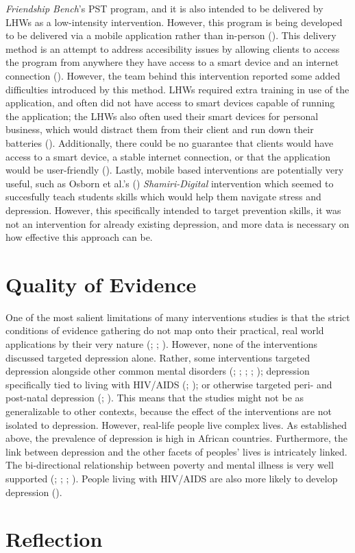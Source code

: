 \documentclass[stu,a4paper,12pt,donotrepeattitle]{apa7}
\begin{document}
\textit{Friendship Bench}'s PST program, and it is also intended to be
delivered by LHWs as a low-intensity intervention. However, this program is
being developed to be delivered via a mobile application rather than in-person
(\cite{douketal21}). This delivery method is an attempt to address accesibility
issues by allowing clients to access the program from anywhere they have access
to a smart device and an internet connection (\cite{douketal21}). However, the
team behind this intervention reported some added difficulties introduced by
this method. LHWs required extra training in use of the application, and often
did not have access to smart devices capable of running the application; the
LHWs also often used their smart devices for personal business, which would
distract them from their client and run down their batteries
(\cite{douketal21}). Additionally, there could be no guarantee that clients
would have access to a smart device, a stable internet connection, or that
the application would be user-friendly (\cite{douketal21}). Lastly, mobile
based interventions are potentially very useful, such as Osborn et al.'s
(\citeyear{Osetal20}) \textit{Shamiri-Digital} intervention which seemed to
succesfully teach students skills which would help them navigate stress and
depression. However, this specifically intended to target prevention skills, it
was not an intervention for already existing depression, and more data is
necessary on how effective this approach can be.
\section{Quality of Evidence}
One of the most salient limitations of many interventions studies
is that the strict conditions of evidence gathering do not map onto their
practical, real world applications by their very nature (\cite{douketal21};
\cite{kaz14}; \cite{shed18}). However, none of the interventions discussed
targeted depression alone. Rather, some interventions targeted depression
alongside other common mental disorders (\cite{abasal16}; \cite{chibandaetal11};
\cite{chibandaetal15}; \cite{chibandaetal16}; \cite{douketal21}); depression
specifically tied to living with HIV/AIDS (\cite{logetal18};
\cite{petersenetal14}); or otherwise targeted peri- and post-natal depression
(\cite{lunetal14}; \cite{nyatetal16}). This means that the studies might not be
as generalizable to other contexts, because the effect of the interventions are
not isolated to depression. However, real-life people live complex lives. As
established above, the prevalence of depression is high in African countries.
Furthermore, the link between depression and the other facets of peoples' lives
is intricately linked. The bi-directional relationship between poverty and
mental illness is very well supported (\cite{lundetal10}; \cite{lund12};
\cite{ridetal20}; \cite{wahl17}). People living with HIV/AIDS are also
more likely to develop depression (\cite{logetal18}).
\section{Reflection}
\newpage
\printbibliography
\end{document}
